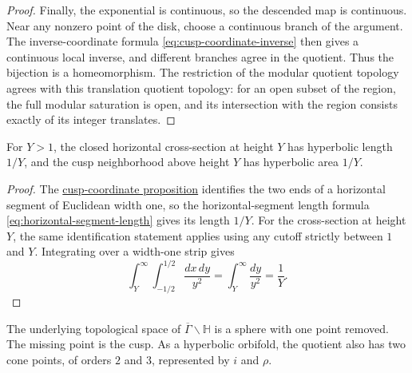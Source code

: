 \begin{proof}
Finally, the exponential is continuous, so the descended map is continuous. Near any nonzero point of the disk, choose a continuous branch of the argument. The inverse-coordinate formula \eqref{eq:cusp-coordinate-inverse} then gives a continuous local inverse, and different branches agree in the quotient. Thus the bijection is a homeomorphism. The restriction of the modular quotient topology agrees with this translation quotient topology: for an open subset of the region, the full modular saturation is open, and its intersection with the region consists exactly of its integer translates.
\end{proof}

\begin{corollary}\label{modular.cusp-area}
For $Y>1$, the closed horizontal cross-section at height $Y$ has hyperbolic length $1/Y$, and the cusp neighborhood above height $Y$ has hyperbolic area $1/Y$.
\end{corollary}

\begin{proof}
The \hyperref[modular.cusp-coordinate]{cusp-coordinate proposition} identifies the two ends of a horizontal segment of Euclidean width one, so the horizontal-segment length formula \eqref{eq:horizontal-segment-length} gives its length $1/Y$. For the cross-section at height $Y$, the same identification statement applies using any cutoff strictly between $1$ and $Y$. Integrating over a width-one strip gives
\[
 \int_Y^\infty\int_{-1/2}^{1/2}\frac{dx\,dy}{y^2}
 =\int_Y^\infty\frac{dy}{y^2}
 =\frac1Y.
\]
\end{proof}

\begin{theorem}\label{modular.quotient-topology}
The underlying topological space of $\overline\Gamma\backslash\mathbb H$ is a sphere with one point removed. The missing point is the cusp. As a hyperbolic orbifold, the quotient also has two cone points, of orders $2$ and $3$, represented by $i$ and $\rho$.
\end{theorem}

